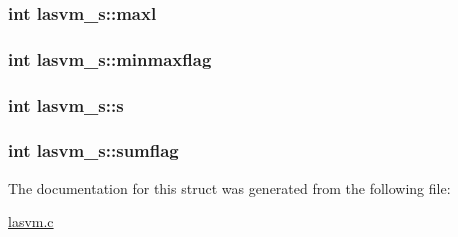 \hypertarget{structlasvm__s_a4e60fb7f603d6ce3168458078ae4ae39}{
\subsubsection[{maxl}]{\setlength{\rightskip}{0pt plus 5cm}int lasvm\+\_\+s\+::maxl}}\label{structlasvm__s_a4e60fb7f603d6ce3168458078ae4ae39}
\hypertarget{structlasvm__s_a0a940757cf44d99e2b50848bc08fd117}{
\subsubsection[{minmaxflag}]{\setlength{\rightskip}{0pt plus 5cm}int lasvm\+\_\+s\+::minmaxflag}}\label{structlasvm__s_a0a940757cf44d99e2b50848bc08fd117}
\hypertarget{structlasvm__s_a6df452ef26ff15a0b47c3aa2e51dfc44}{
\subsubsection[{s}]{\setlength{\rightskip}{0pt plus 5cm}int lasvm\+\_\+s\+::s}}\label{structlasvm__s_a6df452ef26ff15a0b47c3aa2e51dfc44}
\hypertarget{structlasvm__s_a27169eb8896da9095e4a6c456c19e2a3}{
\subsubsection[{sumflag}]{\setlength{\rightskip}{0pt plus 5cm}int lasvm\+\_\+s\+::sumflag}}\label{structlasvm__s_a27169eb8896da9095e4a6c456c19e2a3}


The documentation for this struct was generated from the following file\+:\begin{DoxyCompactItemize}
\item 
\hyperlink{lasvm_8c}{lasvm.\+c}\end{DoxyCompactItemize}
